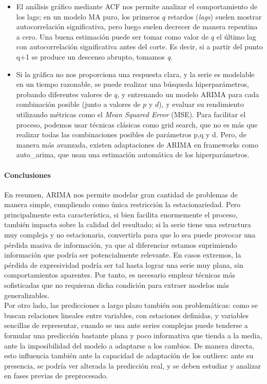 \begin{itemize}
    \item El análisis gráfico mediante ACF nos permite analizar el comportamiento de los lags; en un modelo MA puro, los primeros \( q \) retardos (\textit{lags}) suelen mostrar autocorrelación significativa, pero luego suelen decrecer de manera repentina a cero. Una buena estimación puede ser tomar como valor de \( q \)  el último lag con autocorrelación significativa antes del corte. Es decir, si a partir del punto q+1 se produce un descenso abrupto, tomamos \textit{q}.

    \item Si la gráfica no nos proporciona una respuesta clara, y la serie es modelable en un tiempo razonable, se puede realizar una búsqueda hiperparámetros, probando diferentes valores de \( q \), y entrenando un modelo ARIMA para cada combinación posible (junto a valores de \( p \) y \( d \)), y evaluar su rendimiento utilizando métricas como el \textit{Mean Squared Error} (MSE). Para facilitar el proceso, podemos usar técnicas clásicas como grid search, que no es más que realizar todas las combinaciones posibles de parámetros p,q y d. Pero, de manera más avanzada, existen adaptaciones de ARIMA en frameworks como auto\_arima,  que usan una estimación automática de los hiperparámetros.
\end{itemize}

\paragraph{Conclusiones}


En resumen, ARIMA nos permite modelar gran cantidad de problemas de manera simple, cumpliendo como única restricción la estacionariedad. Pero principalmente esta característica, si bien facilita enormemente el proceso, también impacta sobre la calidad del resultado; si la serie tiene una estructura muy compleja y no estacionaria, convertirla para que lo sea puede provocar una pérdida masiva de información, ya que al diferenciar estamos suprimiendo información que podría ser potencialmente relevante. En casos extremos, la pérdida de expresividad podría ser tal hasta lograr una serie muy plana, sin comportamientos aparentes. Por tanto, es necesario emplear técnicas más sofisticadas que no requieran dicha condición para extraer modelos más generalizables.\\

Por otro lado, las predicciones a largo plazo también son problemáticas: como se buscan relaciones lineales entre variables, con estaciones definidas, y variables sencillas de representar, cuando se usa ante series complejas puede tenderse a formular una predicción bastante plana y poco informativa que tienda a la media, ante la imposibilidad del modelo a adaptarse a los cambios. De manera directa, esto influencia también ante la capacidad de adaptación de los outliers: ante su presencia, se podría ver alterada la predicción real, y se deben estudiar y analizar en fases previas de preprocesado.\\

